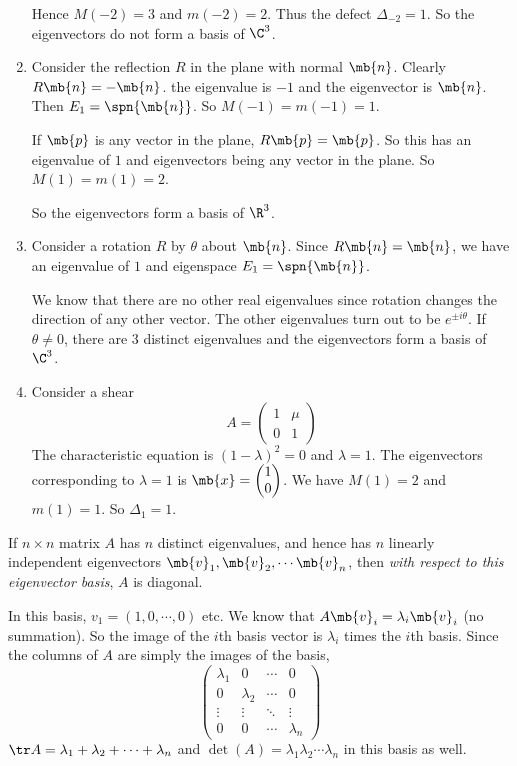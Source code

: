 \documentclass[a4paper]{article}
\begin{document}
\begin{eg}
\begin{enumerate}
     Hence $M(-2) = 3$ and $m(-2) = 2$. Thus the defect $\Delta_{-2} = 1$. So the eigenvectors do not form a basis of $\C^3$.
   \item Consider the reflection $R$ in the plane with normal $\mb{n}$. Clearly $R\mb{n} = -\mb{n}$. the eigenvalue is $-1$ and the eigenvector is $\mb{n}$. Then $E_1 = \spn\{\mb{n}\}$. So $M(-1) = m(-1) = 1$.

     If $\mb{p}$ is any vector in the plane, $R\mb{p} = \mb{p}$. So this has an eigenvalue of $1$ and eigenvectors being any vector in the plane. So $M(1) = m(1) = 2$.

     So the eigenvectors form a basis of $\R^3$.
   \item Consider a rotation $R$ by $\theta$ about $\mb{n}$. Since $R\mb{n} = \mb{n}$, we have an eigenvalue of $1$ and eigenspace $E_1 = \spn\{\mb{n}\}$.

     We know that there are no other real eigenvalues since rotation changes the direction of any other vector. The other eigenvalues turn out to be $e^{\pm i\theta}$. If $\theta \not= 0$, there are 3 distinct eigenvalues and the eigenvectors form a basis of $\C^3$.
   \item Consider a shear
     \[
     A = 
     \begin{pmatrix}
       1&\mu\\0&1
     \end{pmatrix}
     \]
     The characteristic equation is $(1 - \lambda)^2 = 0$ and $\lambda = 1$. The eigenvectors corresponding to $\lambda = 1$ is $\mb{x} = 
     \begin{pmatrix}
       1\\0
     \end{pmatrix}$. We have $M(1) = 2$ and $m(1) = 1$. So $\Delta_1 = 1$.
  \end{enumerate}
\end{eg}
\note If $n\times n$ matrix $A$ has $n$ distinct eigenvalues, and hence has $n$ linearly independent eigenvectors $\mb{v}_1, \mb{v}_2, \cdots \mb{v}_n$, then \emph{with respect to this eigenvector basis}, $A$ is diagonal.

In this basis, $v_1 = (1, 0, \cdots, 0)$ etc. We know that $A\mb{v}_i = \lambda_i\mb{v}_i$ (no summation). So the image of the $i$th basis vector is $\lambda_i$ times the $i$th basis. Since the columns of $A$ are simply the images of the basis,
\[
\begin{pmatrix}
  \lambda_1 & 0 & \cdots & 0\\
  0 & \lambda_2 & \cdots & 0\\
  \vdots & \vdots & \ddots & \vdots\\
  0 & 0 & \cdots & \lambda_n
\end{pmatrix}
\]
\note $\tr A = \lambda_1 + \lambda_2 + \cdots + \lambda_n$ and $\det(A) = \lambda_1\lambda_2\cdots \lambda_n$ in this basis as well.
\end{document}
